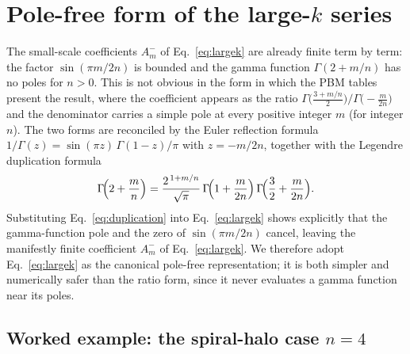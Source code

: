\documentclass[aps,prd,onecolumn]{revtex4-2}
\begin{document}
\section{Pole-free form of the large-$k$ series}
\label{sec:polefree}

The small-scale coefficients $A_m^{-}$ of Eq.~\eqref{eq:largek} are already
finite term by term: the factor $\sin(\pi m/2n)$ is bounded and the gamma
function $\Gamma(2+m/n)$ has no poles for $n>0$.  This is not obvious in
the form in which the PBM tables present the result, where the coefficient
appears as the ratio
$\Gamma\!\bigl(\tfrac{3+m/n}{2}\bigr)/\Gamma\!\bigl(-\tfrac{m}{2n}\bigr)$
and the denominator carries a simple pole at every positive integer $m$
(for integer $n$).  The two forms are reconciled by the Euler reflection
formula $1/\Gamma(z)=\sin(\pi z)\,\Gamma(1-z)/\pi$ with $z=-m/2n$, together
with the Legendre duplication formula
\begin{equation}
\Gamma\!\Bigl(2+\frac mn\Bigr)
=\frac{2^{\,1+m/n}}{\sqrt\pi}\,
 \Gamma\!\Bigl(1+\frac{m}{2n}\Bigr)\,
 \Gamma\!\Bigl(\frac32+\frac{m}{2n}\Bigr) .
\label{eq:duplication}
\end{equation}
Substituting Eq.~\eqref{eq:duplication} into Eq.~\eqref{eq:largek} shows
explicitly that the gamma-function pole and the zero of $\sin(\pi m/2n)$
cancel, leaving the manifestly finite coefficient $A_m^{-}$ of
Eq.~\eqref{eq:largek}.  We therefore adopt Eq.~\eqref{eq:largek} as the
canonical pole-free representation; it is both simpler and numerically
safer than the ratio form, since it never evaluates a gamma function near
its poles.

\subsection{Worked example: the spiral-halo case $n=4$}
\label{sec:n4}
\end{document}
